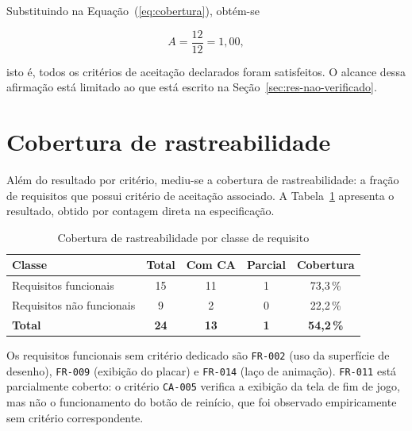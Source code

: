Substituindo na Equação~(\ref{eq:cobertura}), obtém-se

\begin{equation}
	A = \frac{12}{12} = 1{,}00,
	\label{eq:resultado-cobertura}
\end{equation}

\noindent isto é, todos os critérios de aceitação declarados foram satisfeitos.
O alcance dessa afirmação está limitado ao que está escrito na
Seção~\ref{sec:res-nao-verificado}.

\section{Cobertura de rastreabilidade}
\label{sec:res-rastreabilidade}

Além do resultado por critério, mediu-se a cobertura de rastreabilidade: a fração
de requisitos que possui critério de aceitação associado. A
Tabela~\ref{tab:cobertura-req} apresenta o resultado, obtido por contagem direta
na especificação.

\begin{table}[htb]
	\caption{Cobertura de rastreabilidade por classe de requisito}
	\label{tab:cobertura-req}
	\centering
	\footnotesize
	\begin{tabularx}{\textwidth}{@{}p{3.4cm} c c c c@{}}
		\toprule
		\textbf{Classe} & \textbf{Total} & \textbf{Com CA} & \textbf{Parcial} & \textbf{Cobertura} \\
		\midrule
		Requisitos funcionais & 15 & 11 & 1 & 73,3\,\% \\
		\addlinespace
		Requisitos não funcionais & 9 & 2 & 0 & 22,2\,\% \\
		\addlinespace
		\textbf{Total} & \textbf{24} & \textbf{13} & \textbf{1} & \textbf{54,2\,\%} \\
		\bottomrule
	\end{tabularx}
\end{table}

Os requisitos funcionais sem critério dedicado são \texttt{FR-002} (uso da
superfície de desenho), \texttt{FR-009} (exibição do placar) e \texttt{FR-014}
(laço de animação). \texttt{FR-011} está parcialmente coberto: o critério
\texttt{CA-005} verifica a exibição da tela de fim de jogo, mas não o
funcionamento do botão de reinício, que foi observado empiricamente sem
critério correspondente.

